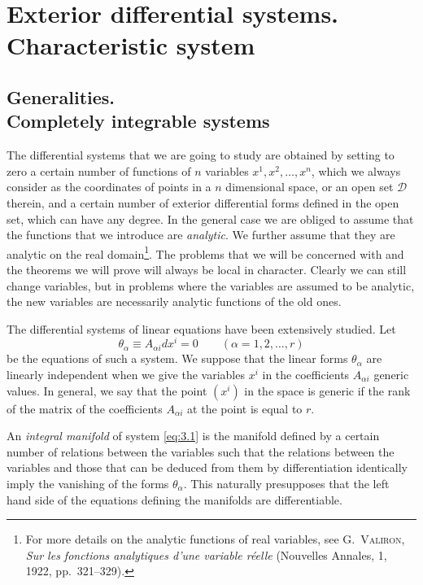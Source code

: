 \chapter{Exterior differential systems. Characteristic system}
\label{cha:exter-diff-syst}

\section[Generalities. Completely integrable systems]{Generalities.\\Completely integrable systems}
\label{sec:gener-compl-integr}

\fsec The differential systems that we are going to study are obtained by setting to zero a certain number of functions of $n$ variables $x^{1},x^{2},\dots,x^{n}$, which we always consider as the coordinates of  points in a $n$ dimensional space, or an open set $\mathcal{D}$ therein, and a certain number of exterior differential forms defined in the open set, which can have any degree.  In the general case we are obliged  to assume that  the functions that we introduce are  \emph{analytic}. We  further assume  that they are analytic on the real domain\footnote{For more details on the analytic functions of real variables, see \textsc{G.~Valiron}, \emph{Sur les fonctions analytiques d'une variable r\'eelle} (Nouvelles Annales, 1, 1922, pp.~321--329).}. The problems that we will be concerned with and the theorems we will prove will always be local in character. Clearly we can still change variables, but in  problems where the variables are assumed to be analytic, the new variables are necessarily analytic functions of the old ones.

\vspace{12pt}\fsec The differential systems of linear equations have been extensively studied. Let
\begin{equation}
  \label{eq:3.1}
  \theta_{\alpha}\equiv A_{\alpha i}dx^{i}=0\qquad(\alpha=1,2,\dots,r)
\end{equation}
be the equations of such a system. We suppose that the linear forms $\theta_{\alpha}$ are linearly independent when we give the variables $x^{i}$ in the coefficients $A_{\alpha i}$ generic values. In general, we say that the point $(x^{i})$ in the space is generic if the rank of the matrix of the coefficients $A_{\alpha i}$  at the point is equal to $r$.

An \emph{integral manifold} of  system \eqref{eq:3.1} is  the manifold defined by a certain number of relations between the variables such that the relations between the variables and those that  can be deduced from them by differentiation identically imply the  vanishing of the forms $\theta_{\alpha}$. This naturally presupposes that the left hand side of the equations defining the manifolds are differentiable.

